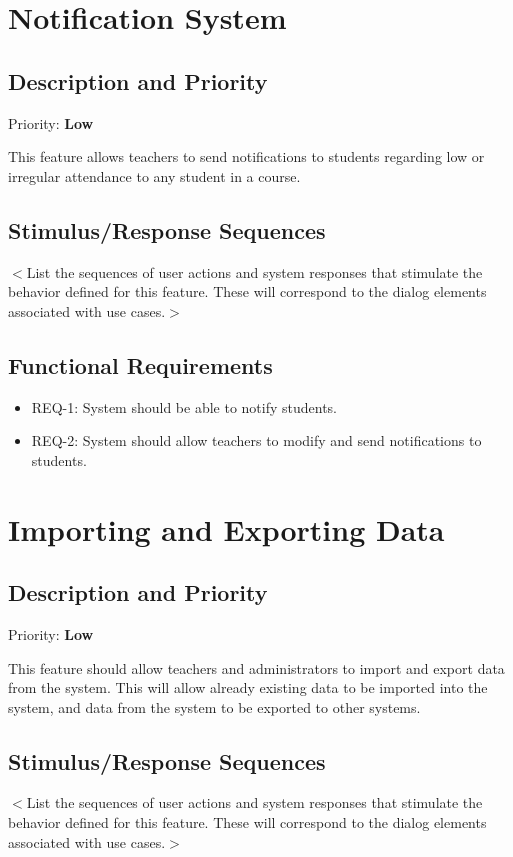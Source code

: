\documentclass{scrreprt}
\begin{document}
\section{Notification System}
\subsection{Description and Priority}
Priority: \textbf{Low}

This feature allows teachers to send notifications to students regarding low or irregular attendance to any student in a course.
\subsection{Stimulus/Response Sequences}
$<$List the sequences of user actions and system responses that stimulate the 
behavior defined for this feature. These will correspond to the dialog elements 
associated with use cases.$>$

\subsection{Functional Requirements}
\begin{itemize}
    \item REQ-1: System should be able to notify students.
\item REQ-2: System should allow teachers to modify and send notifications to students.
\end{itemize}

\section{Importing and Exporting Data}
\subsection{Description and Priority}
Priority: \textbf{Low}

This feature should allow teachers and administrators to import and export data from the system.
This will allow already existing data to be imported into the system, and data from the system to be exported to other systems.
\subsection{Stimulus/Response Sequences}
$<$List the sequences of user actions and system responses that stimulate the 
behavior defined for this feature. These will correspond to the dialog elements 
associated with use cases.$>$
\end{document}
